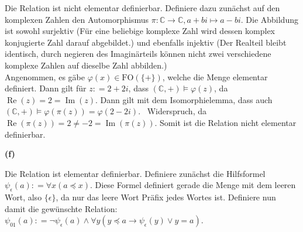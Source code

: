 \documentclass[11pt, a4paper]{article}
\newcommand{\defgr}{\mathrel{\mathop:\!\!=}}
\begin{document}
\begin{adjustwidth}{20pt}{20pt}
	Die Relation ist nicht elementar definierbar. Definiere dazu zunächst auf den komplexen Zahlen den Automorphismus $\pi:\mathbb{C} \to \mathbb{C}, a+bi \mapsto a-bi$. Die Abbildung
	ist sowohl surjektiv (Für eine beliebige komplexe Zahl wird dessen komplex konjugierte Zahl darauf abgebildet.) und ebenfalls injektiv (Der Realteil bleibt identisch, durch negieren des
	Imaginärteils können nicht zwei verschiedene komplexe Zahlen auf dieselbe Zahl abbilden.)\\
	Angenommen, es gäbe $\varphi(x) \in \text{FO}(\{ +\})$, welche die Menge elementar definiert. Dann gilt für $z \defgr 2+2i$, dass $(\mathbb{C},+) \models \varphi(z)$, da
	$\operatorname{Re}(z)=2=\operatorname{Im}(z)$. Dann gilt mit dem Isomorphielemma, dass auch $(\mathbb{C},+) \models \varphi(\pi(z))=\varphi(2-2i)$. \Lightning\ Widerspruch, da
	$\operatorname{Re}(\pi(z))=2\neq -2=\operatorname{Im}(\pi(z))$. Somit ist die Relation nicht elementar definierbar.
\end{adjustwidth}
\textbf{(f)}
\begin{adjustwidth}{20pt}{20pt}
	Die Relation ist elementar definierbar. Definiere zunächst die Hilfsformel $\psi_\epsilon(a) \defgr \forall x(a \preceq x)$. Diese Formel definiert gerade die Menge mit dem leeren Wort, also
	$\{\epsilon\}$, da nur das leere Wort Präfix jedes Wortes ist. Definiere nun damit die gewünschte Relation:\\
	$\psi_{01}(a) \defgr \neg\psi_\epsilon(a) \wedge \forall y(y \preceq a \rightarrow \psi_\epsilon(y) \vee y=a)$.
\end{adjustwidth}
\end{document}
